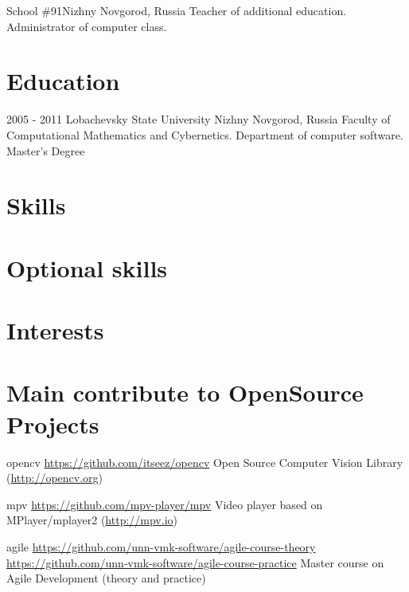 \documentclass[12pt,a4paper]{moderncv}
\begin{document}
	{School \#91}{Nizhny Novgorod, Russia}{}{}
	{Teacher of additional education. Administrator of computer class.}

\section{Education}
  \cventry
    {2005 - 2011}
    {Lobachevsky State University}
    {Nizhny Novgorod, Russia}
    {}{}
    {Faculty of Computational Mathematics and Cybernetics. Department of computer software.\newline{}
    Master's Degree}


\section{Skills}

\section{Optional skills}

\section{Interests}


\section{Main contribute to OpenSource Projects}
\cvline
  {opencv}
  {\url{https://github.com/itseez/opencv}\newline{}
  Open Source Computer Vision Library (\url{http://opencv.org})}

\cvline
  {mpv}
  {\url{https://github.com/mpv-player/mpv}\newline{}
  Video player based on MPlayer/mplayer2 (\url{http://mpv.io})}

\cvline
  {agile}
  {
  \url{https://github.com/unn-vmk-software/agile-course-theory}\newline{}
  \url{https://github.com/unn-vmk-software/agile-course-practice}\newline{}
  Master course on Agile Development (theory and practice)
  }
\end{document}
